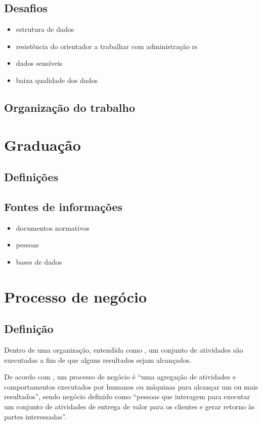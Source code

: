 \documentclass[a4paper]{article}
\begin{document}
\subsection{Desafios}
\begin{itemize}
\item estrutura de dados
\item resistência do orientador a trabalhar com administração rs
\item dados sensíveis
\item baixa qualidade dos dados
\end{itemize}
\subsection{Organização do trabalho}
\section{Graduação}

\subsection{Definições}

\subsection{Fontes de informações}
\begin{itemize}
\item documentos normativos
\item pessoas
\item bases de dados
\end{itemize}

\section{Processo de negócio}
\subsection{Definição}
Dentro de uma organização, entendida como , um conjunto de atividades são executadas a fim de que alguns resultados sejam alcançados.
 
De acordo com \cite{BPM_CBOK}, um processo de negócio é ``uma agregação de atividades e comportamentos executados por humanos ou máquinas para alcançar um ou mais resultados'', sendo negócio definido como ``pessoas que interagem para executar um conjunto de atividades de entrega de valor para os clientes e gerar retorno às partes interessadas''. 
\end{document}
